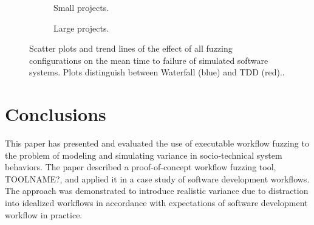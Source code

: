 \documentclass{llncs}
\begin{document}
\begin{figure}
  \centering
  \begin{subfigure}{2.3in}
    \caption{Small projects.}
  \end{subfigure}
  \hfill
  \begin{subfigure}{2.3in}
    \caption{Large projects.}  
  \end{subfigure}
  
  \caption{Scatter plots and trend lines of the effect of all fuzzing configurations on the mean time to failure of
    simulated software systems.  Plots distinguish between Waterfall (blue) and TDD (red)..}
  \label{fig:fuzzing-mtf}
\end{figure}
 



\section{Conclusions}

This paper has presented and evaluated the use of executable workflow fuzzing to the problem of modeling and simulating
variance in socio-technical system behaviors.  The paper described a proof-of-concept workflow fuzzing tool, TOOLNAME?,
and applied it in a case study of software development workflows.  The approach was demonstrated to introduce realistic
variance due to distraction into idealized workflows in accordance with expectations of software development workflow in
practice.
\end{document}

